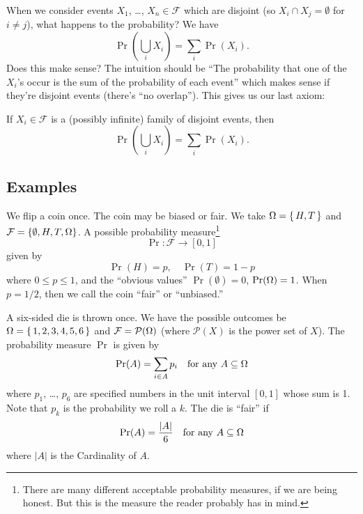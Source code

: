 When we consider events $X_{1}$, \dots, $X_{n}\in\mathcal{F}$ which are
disjoint (so $X_{i}\cap X_{j}=\emptyset$ for $i\not=j$), what happens to
the probability? We have
\begin{equation*}
\Pr\left(\bigcup_{i}X_{i}\right)=\sum_{i}\Pr(X_{i}).
\end{equation*}
Does this make sense? The intuition should be ``The probability that one
of the $X_{i}$'s occur is the sum of the probability of each event''
which makes sense if they're disjoint events (there's ``no
overlap''). This gives us our last axiom:

\begin{axiom}
If $X_{i}\in\mathcal{F}$ is a (possibly infinite) family of disjoint
events, then 
\begin{equation}
\Pr\left(\bigcup_{i}X_{i}\right)=\sum_{i}\Pr(X_{i}).
\end{equation}
\end{axiom}


\subsection{Examples}
We flip a coin once. The coin may be biased or fair. We take
$\Omega=\{\,H,T\,\}$ and
$\mathcal{F}=\{\emptyset,H,T,\Omega\}$. A possible probability
measure\footnote{There are many different acceptable probability
measures, if we are being honest. But this is the measure the reader
probably has in mind.} 
\[
\Pr\colon\mathcal{F}\to[0,1]
\] 
given by
\begin{equation}
\Pr(H)=p,\quad\Pr(T)=1-p
\end{equation}
where $0\leq p\leq1$, and the ``obvious values'' $\Pr(\emptyset)=0$,
$\mathop{\mathrm{Pr}}\nolimits(\Omega)=1$.  When $p=1/2$, then we call the coin ``fair'' or
``unbiased.''

A six-sided die is thrown once. We have the possible outcomes be
$\Omega=\{\,1,2,3,4,5,6\,\}$ and
$\mathcal{F}=\mathcal{P}(\Omega)$ (where $\mathcal{P}(X)$ is the
power set of $X$). The probability measure $\Pr$ is given by
\begin{equation}
\mathop{\mathrm{Pr}}\nolimits(A) = \sum_{i\in A} p_{i}\quad\mbox{for any $A\subseteq\Omega$}
\end{equation}
where $p_1$, \dots, $p_6$ are specified numbers in the unit interval
$[0,1]$ whose sum is 1. Note that $p_k$ is the probability we roll a
$k$. The die is ``fair'' if 
\begin{equation}
\mathop{\mathrm{Pr}}\nolimits(A)=\frac{|A|}{6}\quad\mbox{for any $A\subseteq\Omega$}
\end{equation}
where $|A|$ is the Cardinality of $A$.

